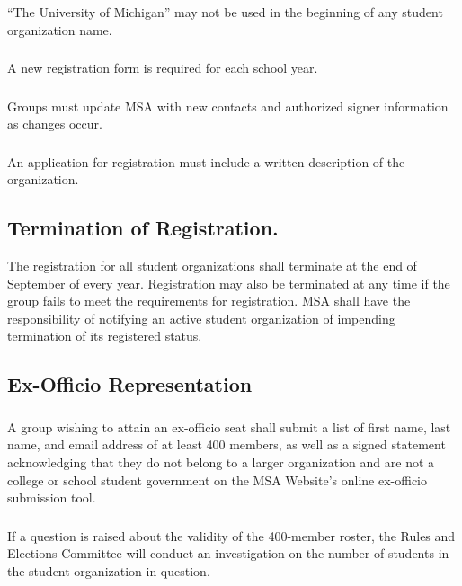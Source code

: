 \subsubsection{}
``The University of Michigan'' may not be used in the beginning of any student organization name.

\subsubsection{}
A new registration form is required for each school year.

\subsubsection{}
Groups must update MSA with new contacts and authorized signer information as changes occur.

\subsubsection{}
An application for registration must include a written description of the organization.

\subsection{Termination of Registration.}
The registration for all student organizations shall terminate at the end of September of every year.  Registration may also be terminated at any time if the group fails to meet the requirements for registration.  MSA shall have the responsibility of notifying an active student organization of impending termination of its registered status.  

\subsection{Ex-Officio Representation}

\subsubsection{}
A group wishing to attain an ex-officio seat shall submit a list of first name, last name, and email address of at least 400 members, as well as a signed statement acknowledging that they do not belong to a larger organization and are not a college or school student government on the MSA Website's online ex-officio submission tool.
\subsubsection{}
If a question is raised about the validity of the 400-member roster, the Rules and Elections Committee will conduct an investigation on the number of students in the student organization in question.

